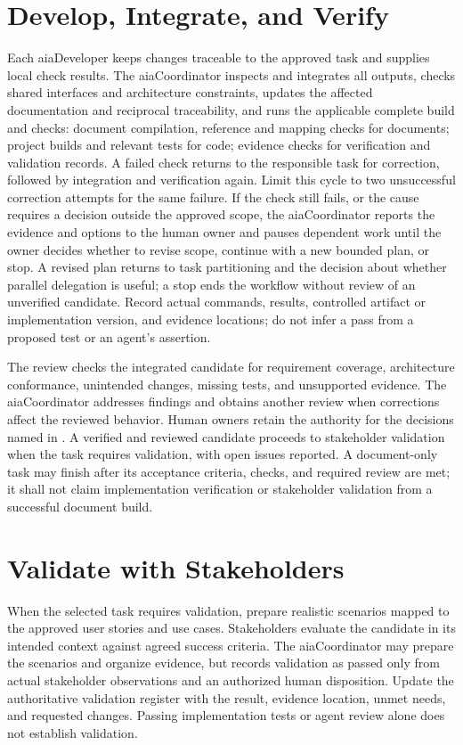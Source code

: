 \section{Develop, Integrate, and Verify}
\label{Section:AIImplementationVerification}
Each aiaDeveloper keeps changes traceable to the approved task and supplies
local check results. The aiaCoordinator inspects and integrates all outputs,
checks shared interfaces and architecture constraints, updates the affected
documentation and reciprocal traceability, and runs the applicable complete build and checks: document compilation,
reference and mapping checks for documents; project builds and relevant tests
for code; evidence checks for verification and validation records. A failed check returns to the responsible task for
correction, followed by integration and verification again. Limit this cycle
to two unsuccessful correction attempts for the same failure. If the check
still fails, or the cause requires a decision outside the approved scope, the
aiaCoordinator reports the evidence and options to the human owner and pauses
dependent work until the owner decides whether to revise scope, continue with
a new bounded plan, or stop. A revised plan returns to task partitioning and
the decision about whether parallel delegation is useful; a stop ends the
workflow without review of an unverified candidate. Record actual
commands, results, controlled artifact or implementation version, and evidence locations;
do not infer a pass from a proposed test or an agent's assertion.

The review checks the integrated candidate for requirement
coverage, architecture conformance, unintended changes, missing tests, and
unsupported evidence. The aiaCoordinator addresses findings and obtains another
review when corrections affect the reviewed behavior. Human owners retain the
authority for the decisions named in . A verified and reviewed candidate proceeds to stakeholder validation when
the task requires validation, with open issues reported. A document-only task
may finish after its acceptance criteria, checks, and required review are met;
it shall not claim implementation verification or stakeholder validation from
a successful document build.

\section{Validate with Stakeholders}
\label{Section:AIImplementationValidation}
When the selected task requires validation, prepare realistic scenarios mapped
to the approved user stories and use cases. Stakeholders evaluate the candidate
in its intended context against agreed success criteria. The aiaCoordinator may
prepare the scenarios and organize evidence, but records validation as passed
only from actual stakeholder observations and an authorized human disposition.
Update the authoritative validation register with the result, evidence
location, unmet needs, and requested changes. Passing implementation tests or
agent review alone does not establish validation.


